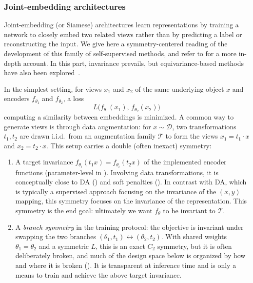 \documentclass[mathematics,review,submit,moreauthors]{Definitions/mdpi}
\begin{document}
\subsubsection{Joint-embedding architectures}\label{sec:joint-embedding}

Joint-embedding (or Siamese) architectures learn representations by training a network to closely embed two related views rather than by predicting a label or reconstructing the input.
We give here a symmetry-centered reading of the development of this family of self-supervised methods, and refer to \citet{ilina2022sa} for a more in-depth account.
In this part, invariance prevails, but equivariance-based methods have also been explored~\citep{gupta2023a}.

In the simplest setting, for views $x_1$ and $x_2$ of the same underlying object $x$ and encoders $f_{\theta_1}$ and $f_{\theta_2}$, a loss 
\begin{equation}\label{eq:joint-embeddings}
    L\big(f_{\theta_1}(x_1),\,f_{\theta_2}(x_2)\big)
\end{equation}
computing a similarity between embeddings is minimized.
A common way to generate views is through data augmentation: for $x\sim\mathcal{D}$, two transformations $t_1,t_2$ are drawn i.i.d.\ from an augmentation family $\mathcal{T}$ to form the views $x_1=t_1\cdot x$ and $x_2=t_2\cdot x$.
This setup carries a double (often inexact) symmetry:
\begin{enumerate}
    \item A target invariance $f_{\theta_i}(t_1x)=f_{\theta_i}(t_2x)$ of the implemented encoder functions (parameter-level in ).
    Involving data transformations, it is conceptually close to DA () and soft penalties ().
    In contrast with DA, which is typically a supervised approach focusing on the invariance of the $(x,y)$ mapping, this symmetry focuses on the invariance of the representation.
    This symmetry is the end goal: ultimately we want $f_\theta$ to be invariant to $\mathcal{T}$.
    \item A \emph{branch symmetry} in the training protocol: the objective is invariant under swapping the two branches $(\theta_1,t_1)\leftrightarrow(\theta_2,t_2)$.
    With shared weights $\theta_1=\theta_2$ and a symmetric $L$, this is an exact $C_2$ symmetry, but it is often deliberately broken, and much of the design space below is organized by how and where it is broken ().
    It is transparent at inference time and is only a means to train and achieve the above target invariance.
\end{enumerate}
\end{document}
